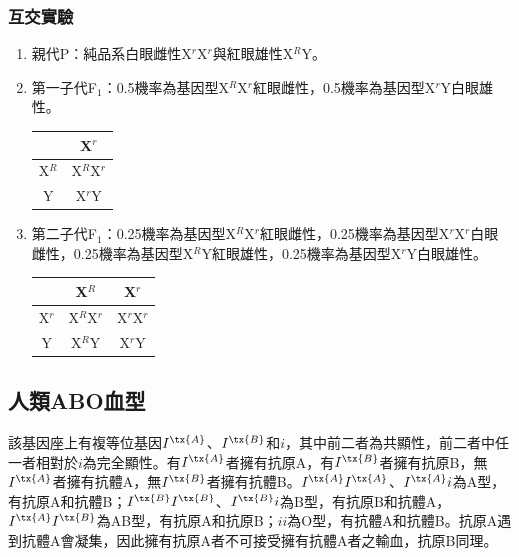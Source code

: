 \documentclass[a4paper,12pt]{report}
\begin{document}
\subsubsection{互交實驗}
\begin{enumerate}
\item 親代P：純品系白眼雌性X$^r$X$^r$與紅眼雄性X$^R$Y。
\item 第一子代F$_1$：0.5機率為基因型X$^R$X$^r$紅眼雌性，0.5機率為基因型X$^r$Y白眼雄性。
\begin{longtable}[c]{|c|c|}
\hline
& X$^r$ \\ \hline
X$^R$ & X$^R$X$^r$ \\ \hline
Y & X$^r$Y \\ \hline
\end{longtable}
\item 第二子代F$_1$：0.25機率為基因型X$^R$X$^r$紅眼雌性，0.25機率為基因型X$^r$X$^r$白眼雌性，0.25機率為基因型X$^R$Y紅眼雄性，0.25機率為基因型X$^r$Y白眼雄性。
\begin{longtable}[c]{|c|c|c|}
\hline
& X$^R$ & X$^r$ \\ \hline
X$^r$ & X$^R$X$^r$ & X$^r$X$^r$ \\ \hline
Y & X$^R$Y & X$^r$Y \\ \hline
\end{longtable}
\end{enumerate}
\subsection{人類ABO血型}
該基因座上有複等位基因$I^{\tx{A}}$、$I^{\tx{B}}$和$i$，其中前二者為共顯性，前二者中任一者相對於$i$為完全顯性。有$I^{\tx{A}}$者擁有抗原A，有$I^{\tx{B}}$者擁有抗原B，無$I^{\tx{A}}$者擁有抗體A，無$I^{\tx{B}}$者擁有抗體B。$I^{\tx{A}}I^{\tx{A}}$、$I^{\tx{A}}i$為A型，有抗原A和抗體B；$I^{\tx{B}}I^{\tx{B}}$、$I^{\tx{B}}i$為B型，有抗原B和抗體A，$I^{\tx{A}}I^{\tx{B}}$為AB型，有抗原A和抗原B；$ii$為O型，有抗體A和抗體B。抗原A遇到抗體A會凝集，因此擁有抗原A者不可接受擁有抗體A者之輸血，抗原B同理。
\end{document}
